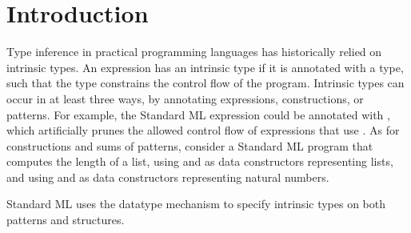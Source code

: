 \documentclass[acmsmall]{acmart}
\theoremstyle{definition}
\begin{document}
\newcommand{\is}{\ ::=\ }
\newcommand{\sep}{\ \ |\ \ }
\newcommand{\nonterm}[1]{#1\ }
\newcommand{\contin}{|\ \ \ \ \ \ \ }
\newcommand{\wrt}{\B{wrt }}



\newcommand{\pc}{\hfill \break \noindent \ $\diamond$ \ }


\newcommand{\N}{\ $\cdot$\ \ }

\newcommand{\pitem}{\item[$\diamond$]}

\newcommand{\tl}{\textasciitilde{}}
\newcommand{\typdiff}{\J{\textbackslash}}

\maketitle



\section{Introduction}
\label{sec:introduction}

Type inference in practical programming languages has historically relied on intrinsic types.
An expression has an intrinsic type if it is annotated with a type, such that the type
constrains the control flow of the program.  
Intrinsic types can occur in at least three ways, by annotating
expressions, constructions, or patterns.     
For example, the Standard ML expression 
could be annotated with ,
which artificially prunes the allowed control flow of expressions that use .
As for constructions and sums of patterns, consider a Standard ML program that computes the length of a list,
using  and  as data constructors representing lists, 
and using  and  as data constructors representing natural numbers.


\noindent
Standard ML uses the datatype mechanism to specify intrinsic types on both patterns and structures.
\end{document}

